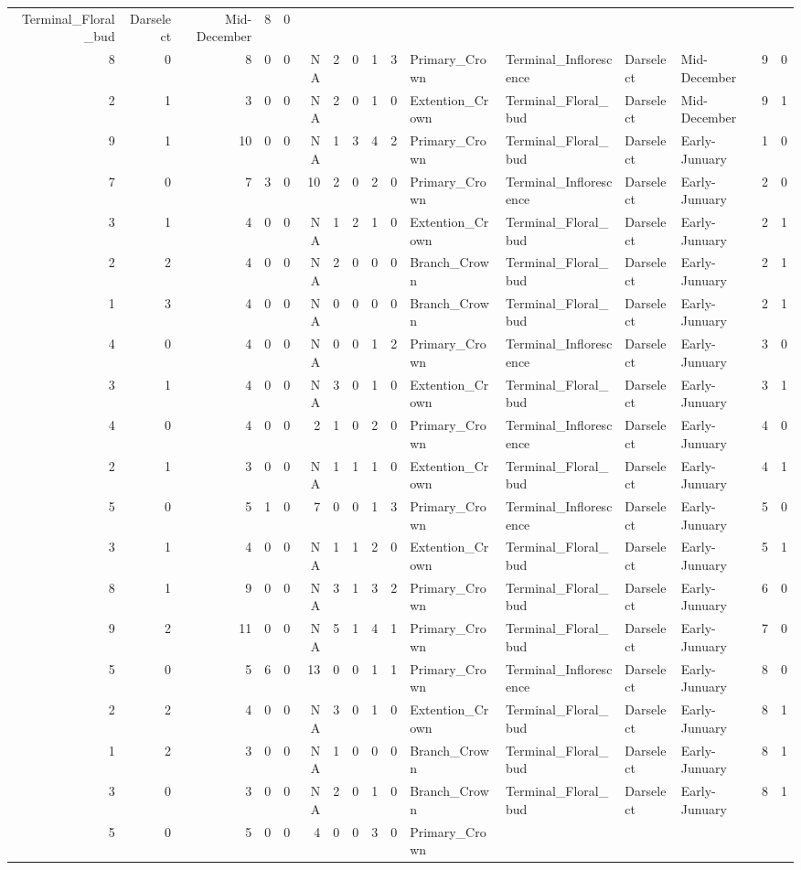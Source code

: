 \documentclass[]{article}
\begin{document}
\begin{longtable}[]{@{}rrrrrrrrrrllllrl@{}}
Terminal\_Floral\_bud & Darselect & Mid-December & 8 & 0\tabularnewline
8 & 0 & 8 & 0 & 0 & NA & 2 & 0 & 1 & 3 & Primary\_Crown &
Terminal\_Inflorescence & Darselect & Mid-December & 9 &
0\tabularnewline
2 & 1 & 3 & 0 & 0 & NA & 2 & 0 & 1 & 0 & Extention\_Crown &
Terminal\_Floral\_bud & Darselect & Mid-December & 9 & 1\tabularnewline
9 & 1 & 10 & 0 & 0 & NA & 1 & 3 & 4 & 2 & Primary\_Crown &
Terminal\_Floral\_bud & Darselect & Early-Junuary & 1 & 0\tabularnewline
7 & 0 & 7 & 3 & 0 & 10 & 2 & 0 & 2 & 0 & Primary\_Crown &
Terminal\_Inflorescence & Darselect & Early-Junuary & 2 &
0\tabularnewline
3 & 1 & 4 & 0 & 0 & NA & 1 & 2 & 1 & 0 & Extention\_Crown &
Terminal\_Floral\_bud & Darselect & Early-Junuary & 2 & 1\tabularnewline
2 & 2 & 4 & 0 & 0 & NA & 2 & 0 & 0 & 0 & Branch\_Crown &
Terminal\_Floral\_bud & Darselect & Early-Junuary & 2 & 1\tabularnewline
1 & 3 & 4 & 0 & 0 & NA & 0 & 0 & 0 & 0 & Branch\_Crown &
Terminal\_Floral\_bud & Darselect & Early-Junuary & 2 & 1\tabularnewline
4 & 0 & 4 & 0 & 0 & NA & 0 & 0 & 1 & 2 & Primary\_Crown &
Terminal\_Inflorescence & Darselect & Early-Junuary & 3 &
0\tabularnewline
3 & 1 & 4 & 0 & 0 & NA & 3 & 0 & 1 & 0 & Extention\_Crown &
Terminal\_Floral\_bud & Darselect & Early-Junuary & 3 & 1\tabularnewline
4 & 0 & 4 & 0 & 0 & 2 & 1 & 0 & 2 & 0 & Primary\_Crown &
Terminal\_Inflorescence & Darselect & Early-Junuary & 4 &
0\tabularnewline
2 & 1 & 3 & 0 & 0 & NA & 1 & 1 & 1 & 0 & Extention\_Crown &
Terminal\_Floral\_bud & Darselect & Early-Junuary & 4 & 1\tabularnewline
5 & 0 & 5 & 1 & 0 & 7 & 0 & 0 & 1 & 3 & Primary\_Crown &
Terminal\_Inflorescence & Darselect & Early-Junuary & 5 &
0\tabularnewline
3 & 1 & 4 & 0 & 0 & NA & 1 & 1 & 2 & 0 & Extention\_Crown &
Terminal\_Floral\_bud & Darselect & Early-Junuary & 5 & 1\tabularnewline
8 & 1 & 9 & 0 & 0 & NA & 3 & 1 & 3 & 2 & Primary\_Crown &
Terminal\_Floral\_bud & Darselect & Early-Junuary & 6 & 0\tabularnewline
9 & 2 & 11 & 0 & 0 & NA & 5 & 1 & 4 & 1 & Primary\_Crown &
Terminal\_Floral\_bud & Darselect & Early-Junuary & 7 & 0\tabularnewline
5 & 0 & 5 & 6 & 0 & 13 & 0 & 0 & 1 & 1 & Primary\_Crown &
Terminal\_Inflorescence & Darselect & Early-Junuary & 8 &
0\tabularnewline
2 & 2 & 4 & 0 & 0 & NA & 3 & 0 & 1 & 0 & Extention\_Crown &
Terminal\_Floral\_bud & Darselect & Early-Junuary & 8 & 1\tabularnewline
1 & 2 & 3 & 0 & 0 & NA & 1 & 0 & 0 & 0 & Branch\_Crown &
Terminal\_Floral\_bud & Darselect & Early-Junuary & 8 & 1\tabularnewline
3 & 0 & 3 & 0 & 0 & NA & 2 & 0 & 1 & 0 & Branch\_Crown &
Terminal\_Floral\_bud & Darselect & Early-Junuary & 8 & 1\tabularnewline
5 & 0 & 5 & 0 & 0 & 4 & 0 & 0 & 3 & 0 & Primary\_Crown &

\end{longtable}
\end{document}
